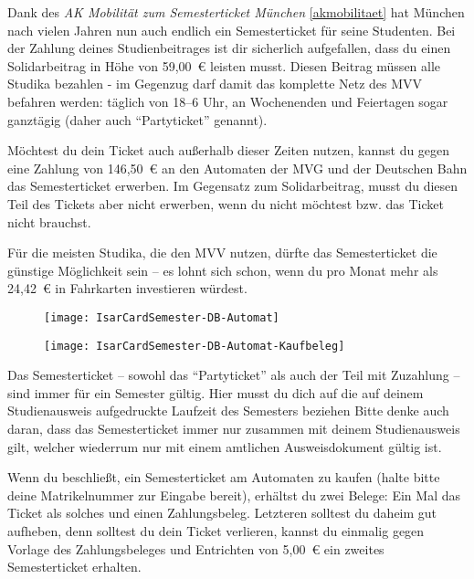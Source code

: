 Dank des \emph{AK Mobilität zum Semesterticket München} \ref{akmobilitaet} hat
München nach vielen Jahren nun auch endlich ein Semesterticket für seine
Studenten. Bei der Zahlung deines Studienbeitrages ist dir sicherlich
aufgefallen, dass du einen Solidarbeitrag in Höhe von 59,00~€ leisten musst.
Diesen Beitrag müssen alle Studika bezahlen - im Gegenzug darf damit das
komplette Netz des MVV befahren werden: täglich von 18--6 Uhr, an Wochenenden
und Feiertagen sogar ganztägig (daher auch ``Partyticket'' genannt).

Möchtest du dein Ticket auch außerhalb dieser Zeiten nutzen, kannst du gegen
eine Zahlung von 146,50~€ an den Automaten der MVG und der
Deutschen Bahn das Semesterticket erwerben. Im Gegensatz zum Solidarbeitrag,
musst du diesen Teil des Tickets aber nicht erwerben, wenn du nicht möchtest
bzw. das Ticket nicht brauchst.

Für die meisten Studika, die den MVV nutzen, dürfte das Semesterticket die
günstige Möglichkeit sein -- es lohnt sich schon, wenn du pro Monat mehr als
24,42~€ in Fahrkarten investieren würdest.

\begin{figure}[ht]
\centering
	\begin{minipage}[b]{0.45\linewidth}
		\texttt{[image: IsarCardSemester-DB-Automat]}
		\label{fig:isarcardsemesterdb}
	\end{minipage}
	\quad
	\begin{minipage}[b]{0.45\linewidth}
		\texttt{[image: IsarCardSemester-DB-Automat-Kaufbeleg]}
		\label{fig:isarcardsemesterbelegdb}
	\end{minipage}
\end{figure}

Das Semesterticket -- sowohl das ``Partyticket'' als auch der Teil mit
Zuzahlung -- sind immer für ein Semester gültig. Hier musst du dich auf die auf
deinem Studienausweis aufgedruckte Laufzeit des Semesters beziehen
Bitte denke auch daran, dass das Semesterticket immer nur zusammen
mit deinem Studienausweis gilt, welcher wiederrum nur mit einem amtlichen
Ausweisdokument gültig ist.

Wenn du beschließt, ein Semesterticket am Automaten zu kaufen (halte bitte deine
Matrikelnummer zur Eingabe bereit), erhältst du zwei Belege: Ein Mal das Ticket
als solches und einen Zahlungsbeleg. Letzteren solltest du daheim gut aufheben,
denn solltest du dein Ticket verlieren, kannst du einmalig gegen Vorlage des
Zahlungsbeleges und Entrichten von 5,00~€ ein zweites Semesterticket erhalten.

